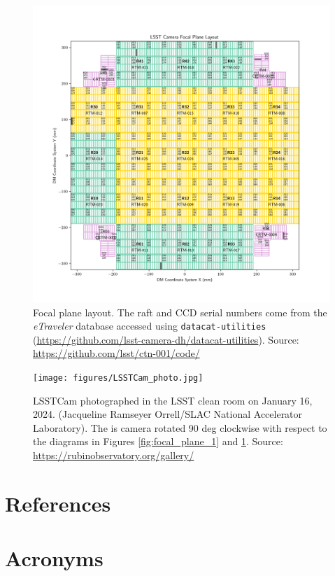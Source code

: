 \documentclass[OPS,lsstdraft,authoryear,toc]{lsstdoc}
\begin{document}
\clearpage

\begin{figure}
  \centering
  \includegraphics[width=\textwidth]{figures/LSSTCam_fp_layout_seth_Oct2024.png}
  \caption{Focal plane layout. The raft and CCD serial numbers come from the \emph{eTraveler} database accessed using {\tt{datacat-utilities}} (\url{https://github.com/lsst-camera-dh/datacat-utilities}). Source: \url{https://github.com/lsst/ctn-001/code/}}
  \label{fig:focal_plane_2}
\end{figure}

\clearpage

\begin{figure}
  \centering
  \texttt{[image: figures/LSSTCam\_photo.jpg]}
  \caption{LSSTCam photographed in the LSST clean room on January 16, 2024. (Jacqueline Ramseyer Orrell/SLAC National Accelerator Laboratory). The is camera rotated 90 deg clockwise with respect to the diagrams in Figures \ref{fig:focal_plane_1} and \ref{fig:focal_plane_2}. Source: \url{https://rubinobservatory.org/gallery/}}
  \label{fig:focal_plane_3}
\end{figure}

\appendix
\section{References} \label{sec:bib}
\renewcommand{\refname}{} %


\section{Acronyms} \label{sec:acronyms}

\end{document}

